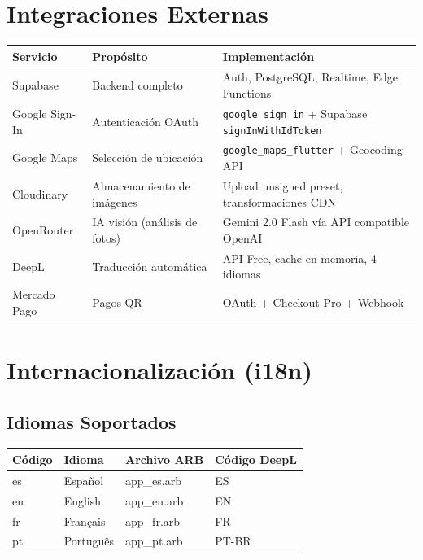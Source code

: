 \documentclass[12pt,a4paper]{article}
\begin{document}
\section{Integraciones Externas}

\begin{tabularx}{\textwidth}{llX}
\toprule
\textbf{Servicio} & \textbf{Prop\'osito} & \textbf{Implementaci\'on} \\
\midrule
Supabase & Backend completo & Auth, PostgreSQL, Realtime, Edge Functions \\
Google Sign-In & Autenticaci\'on OAuth & \texttt{google\_sign\_in} + Supabase \texttt{signInWithIdToken} \\
Google Maps & Selecci\'on de ubicaci\'on & \texttt{google\_maps\_flutter} + Geocoding API \\
Cloudinary & Almacenamiento de im\'agenes & Upload unsigned preset, transformaciones CDN \\
OpenRouter & IA visi\'on (an\'alisis de fotos) & Gemini 2.0 Flash v\'ia API compatible OpenAI \\
DeepL & Traducci\'on autom\'atica & API Free, cache en memoria, 4 idiomas \\
Mercado Pago & Pagos QR & OAuth + Checkout Pro + Webhook \\
\bottomrule
\end{tabularx}

\section{Internacionalizaci\'on (i18n)}

\subsection{Idiomas Soportados}

\begin{tabularx}{\textwidth}{llll}
\toprule
\textbf{C\'odigo} & \textbf{Idioma} & \textbf{Archivo ARB} & \textbf{C\'odigo DeepL} \\
\midrule
es & Espa\~nol & app\_es.arb & ES \\
en & English & app\_en.arb & EN \\
fr & Fran\c{c}ais & app\_fr.arb & FR \\
pt & Portugu\^es & app\_pt.arb & PT-BR \\
\bottomrule
\end{tabularx}
\end{document}
